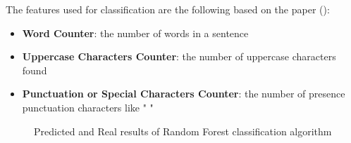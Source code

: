 The features used for classification are the following based on the paper (\cite{Lawrence2016}):

\begin{itemize}
	\item \textbf{Word Counter}: the number of words in a sentence
	\item \textbf{Uppercase Characters Counter}: the number of uppercase characters found
	\item \textbf{Punctuation or Special Characters Counter}: the number of presence punctuation characters like " "
\end{itemize} 

\begin{figure}[H]
	\centering
	\qquad
	\caption{
		Predicted and Real results of Random Forest classification algorithm
	}
	\label{random_forest}
\end{figure}

